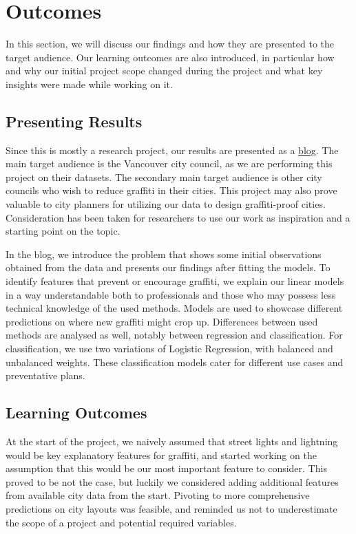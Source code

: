 \chapter{Outcomes}
In this section, we will discuss our findings and how they are presented to the target audience. Our learning outcomes are also introduced, in particular how and why our initial project scope changed during the project and what key insights were made while working on it.

\section{Presenting Results}

Since this is mostly a research project, our results are presented as a \href{https://cowkeyman.github.io/PredictingGraffitiUsingCityLayouts/}{blog}. The main target audience is the Vancouver city council, as we are performing this project on their datasets. The secondary main target audience is other city councils who wish to reduce graffiti in their cities. This project may also prove valuable to city planners for utilizing our data to design graffiti-proof cities. Consideration has been taken for researchers to use our work as inspiration and a starting point on the topic.

In the blog, we introduce the problem that shows some initial observations obtained from the data and presents our findings after fitting the models. To identify features that prevent or encourage graffiti, we explain our linear models in a way understandable both to professionals and those who may possess less technical knowledge of the used methods. Models are used to showcase different predictions on where new graffiti might crop up. Differences between used methods are analysed as well, notably between regression and classification. For classification, we use two variations of Logistic Regression, with balanced and unbalanced weights. These classification models cater for different use cases and preventative plans.

\section{Learning Outcomes} %
At the start of the project, we naively assumed that street lights and lightning would be key explanatory features for graffiti, and started working on the assumption that this would be our most important feature to consider. This proved to be not the case, but luckily we considered adding additional features from available city data from the start. Pivoting to more comprehensive predictions on city layouts was feasible, and reminded us not to underestimate the scope of a project and potential required variables.

